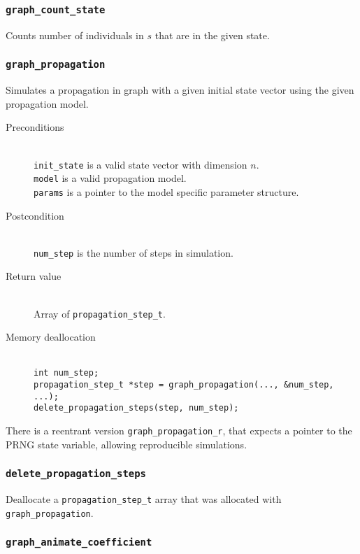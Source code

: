 \subsubsection{\texttt{graph\_count\_state}}

Counts number of individuals in $s$ that are in the given state.

\subsubsection{\texttt{graph\_propagation}}

Simulates a propagation in graph with a given initial state vector using
the given propagation model.

\begin{description}
 \item[Preconditions]~\\
   \texttt{init\_state} is a valid state vector with dimension $n$.\\
   \texttt{model} is a valid propagation model.\\
   \texttt{params} is a pointer to the model specific parameter structure.
 \item[Postcondition]~\\
   \texttt{num\_step} is the number of steps in simulation.
 \item[Return value]~\\
   Array of \texttt{propagation\_step\_t}.
 \item[Memory deallocation]~\\
   \texttt{int num\_step;}\\
   \texttt{propagation\_step\_t *step = graph\_propagation(..., \&num\_step, ...);}\\
   \texttt{delete\_propagation\_steps(step, num\_step);}
\end{description}

There is a reentrant version \texttt{graph\_propagation\_r}, that expects a
pointer to the PRNG state variable, allowing reproducible simulations.

\subsubsection{\texttt{delete\_propagation\_steps}}

Deallocate a \texttt{propagation\_step\_t} array that was allocated with 
\texttt{graph\_propagation}.

\subsubsection{\texttt{graph\_animate\_coefficient}}


